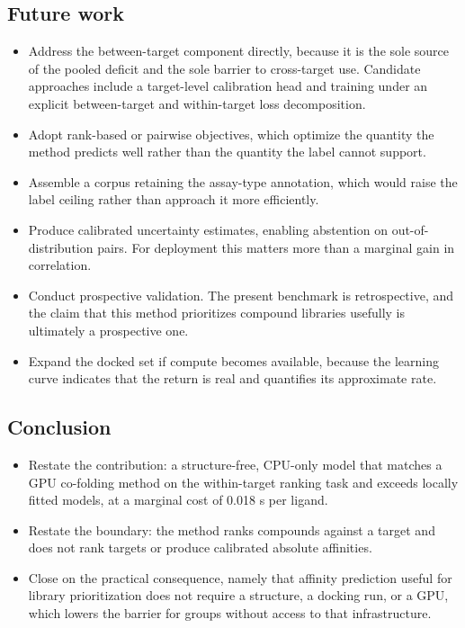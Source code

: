 \documentclass[11pt]{article}
\begin{document}
\subsection*{Future work}
\begin{itemize}
  \item Address the between-target component directly, because it is the sole
        source of the pooled deficit and the sole barrier to cross-target use.
        Candidate approaches include a target-level calibration head and
        training under an explicit between-target and within-target loss
        decomposition.
  \item Adopt rank-based or pairwise objectives, which optimize the quantity
        the method predicts well rather than the quantity the label cannot
        support.
  \item Assemble a corpus retaining the assay-type annotation, which would
        raise the label ceiling rather than approach it more efficiently.
  \item Produce calibrated uncertainty estimates, enabling abstention on
        out-of-distribution pairs. For deployment this matters more than a
        marginal gain in correlation.
  \item Conduct prospective validation. The present benchmark is retrospective,
        and the claim that this method prioritizes compound libraries usefully
        is ultimately a prospective one.
  \item Expand the docked set if compute becomes available, because the
        learning curve indicates that the return is real and quantifies its
        approximate rate.
\end{itemize}

\subsection*{Conclusion}
\begin{itemize}
  \item Restate the contribution: a structure-free, CPU-only model that matches
        a GPU co-folding method on the within-target ranking task and exceeds
        locally fitted models, at a marginal cost of 0.018 s per ligand.
  \item Restate the boundary: the method ranks compounds against a target and
        does not rank targets or produce calibrated absolute affinities.
  \item Close on the practical consequence, namely that affinity prediction
        useful for library prioritization does not require a structure, a
        docking run, or a GPU, which lowers the barrier for groups without
        access to that infrastructure.
\end{itemize}
\end{document}
